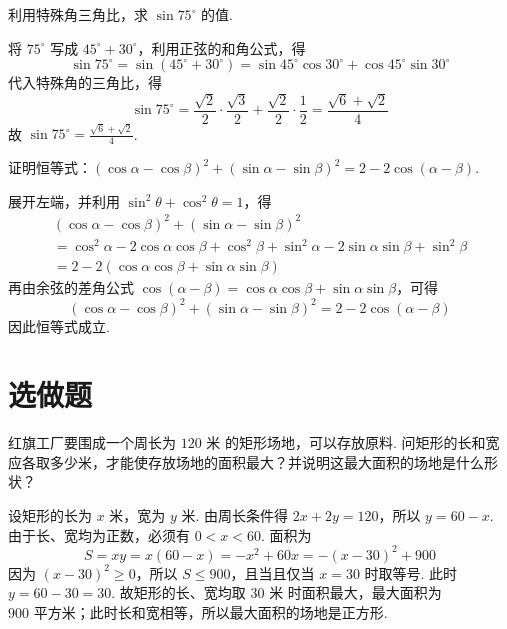 \begin{problem}
利用特殊角三角比，求 \(\sin75^\circ\) 的值.
\end{problem}

\begin{solution}
将 \(75^\circ\) 写成 \(45^\circ+30^\circ\)，利用正弦的和角公式，得
\[
\sin75^\circ=\sin\left(45^\circ+30^\circ\right)=\sin45^\circ\cos30^\circ+\cos45^\circ\sin30^\circ
\]
代入特殊角的三角比，得
\[
\sin75^\circ=\frac{\sqrt{2}}{2}\cdot\frac{\sqrt{3}}{2}+\frac{\sqrt{2}}{2}\cdot\frac{1}{2}=\frac{\sqrt{6}+\sqrt{2}}{4}
\]
故 \(\sin75^\circ=\frac{\sqrt{6}+\sqrt{2}}{4}\).
\end{solution}

\begin{problem}
证明恒等式：\(\left(\cos\alpha-\cos\beta\right)^2+\left(\sin\alpha-\sin\beta\right)^2=2-2\cos\left(\alpha-\beta\right)\).
\end{problem}

\begin{solution}
展开左端，并利用 \(\sin^2\theta+\cos^2\theta=1\)，得
\[
\begin{gathered}
\left(\cos\alpha-\cos\beta\right)^2+\left(\sin\alpha-\sin\beta\right)^2\\
=\cos^2\alpha-2\cos\alpha\cos\beta+\cos^2\beta+\sin^2\alpha-2\sin\alpha\sin\beta+\sin^2\beta\\
=2-2\left(\cos\alpha\cos\beta+\sin\alpha\sin\beta\right)
\end{gathered}
\]
再由余弦的差角公式 \(\cos\left(\alpha-\beta\right)=\cos\alpha\cos\beta+\sin\alpha\sin\beta\)，可得
\[
\left(\cos\alpha-\cos\beta\right)^2+\left(\sin\alpha-\sin\beta\right)^2=2-2\cos\left(\alpha-\beta\right)
\]
因此恒等式成立.
\end{solution}

\section{选做题}

\begin{problem}
红旗工厂要围成一个周长为 \(120\text{ 米}\) 的矩形场地，可以存放原料. 问矩形的长和宽应各取多少米，才能使存放场地的面积最大？并说明这最大面积的场地是什么形状？
\end{problem}

\begin{solution}
设矩形的长为 \(x\text{ 米}\)，宽为 \(y\text{ 米}\). 由周长条件得 \(2x+2y=120\)，所以 \(y=60-x\). 由于长、宽均为正数，必须有 \(0<x<60\). 面积为
\[
S=xy=x\left(60-x\right)=-x^2+60x=-\left(x-30\right)^2+900
\]
因为 \(\left(x-30\right)^2\geq0\)，所以 \(S\leq900\)，且当且仅当 \(x=30\) 时取等号. 此时 \(y=60-30=30\). 故矩形的长、宽均取 \(30\text{ 米}\) 时面积最大，最大面积为 \(900\text{ 平方米}\)；此时长和宽相等，所以最大面积的场地是正方形.
\end{solution}

